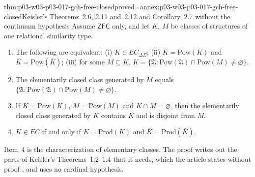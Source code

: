 \begin{hbtheorem}{thm:p03-w03-p03-017-gch-free-closed}{proved=annex:p03-w03-p03-017-gch-free-closed}{Keisler's Theorems~2.6, 2.11 and~2.12 and Corollary~2.7 without the continuum hypothesis}
Assume \(\mathsf{ZFC}\) only, and let \(K\), \(M\) be classes of structures
of one relational similarity type.
\begin{enumerate}
  \item The following are equivalent: (i) \(K\in EC_{\Delta\Sigma}\);
        (ii) \(K=\mathrm{Pow}(K)\) and \(\bar K=\mathrm{Pow}(\bar K)\);
        (iii) for some \(M\subseteq K\),
        \(K=\{\mathfrak A:\mathrm{Pow}(\mathfrak A)\cap\mathrm{Pow}(M)\neq
        \varnothing\}\).
  \item The elementarily closed class generated by \(M\) equals
        \(\{\mathfrak A:\mathrm{Pow}(\mathfrak A)\cap\mathrm{Pow}(M)\neq
        \varnothing\}\).
  \item If \(K=\mathrm{Pow}(K)\), \(M=\mathrm{Pow}(M)\) and
        \(K\cap M=\varnothing\), then the elementarily closed class
        generated by \(K\) contains \(K\) and is disjoint from \(M\).
  \item \(K\in EC\) if and only if \(K=\mathrm{Prod}(K)\) and
        \(\bar K=\mathrm{Prod}(\bar K)\).
\end{enumerate}
Item~4 is the characterization of elementary classes.  The proof writes out
the parts of Keisler's Theorems~1.2--1.4 that it needs, which the article
states without proof \cite[p.~483]{Keisler1961ElementaryClasses}, and uses
no cardinal hypothesis.
\end{hbtheorem}

